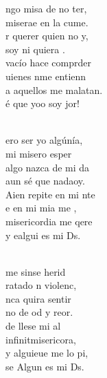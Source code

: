 \documentclass[12pt]{article}
\begin{document}
\begin{multicols*}{2}
\begin{cancion}%
	ngo misa de no ter,\\
	 miserae en la cume.\\
	r querer  quien no y,\\
	soy ni quiera .\\
	 vacío hace comprder\\
	uienes nme entienn\\
	a aquellos  me malatan.\\
	é que yoo soy jor!\\\jump\\
	\begin{chorus}%
	ero ser yo algúnía,\\
	 mi misero esper\\
	 algo nazca de mi da\\
	aun sé que nadaoy.\\
	Aien repite en mi nte\\
	e en mi mia me ,\\
	 misericordia me qere\\
	y ealgui es mi Ds.\\
	\end{chorus}%
	\jump\\
	 me sinse herid\\
	ratado n violenc,\\
	nca quira sentir\\
	no de od y reor.\\
	 de llese mi al\\
	infinitmisericora,\\
	y alguieue me lo pi,\\
	se Algun es mi Ds.\\
\end{cancion}%


\end{multicols*}
\end{document}
